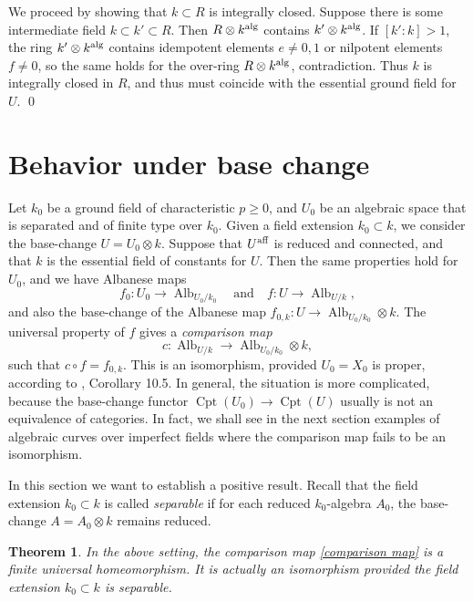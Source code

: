 \documentclass[oneside, 12pt]{amsart}
\newcommand\mylabel[1]{\label{#1}\marginpar{\vspace{-1ex}\medskip\medskip\footnotesize \tt #1}}
\renewcommand\mylabel[1]{\label{#1}}
\newtheorem{theorem}{Theorem}[section]
\theoremstyle{definition}
\theoremstyle{remark}
\newcommand{\aff}{\text{\rm aff}}
\newcommand{\alg}{\text{\rm alg}}
\newcommand{\Alb}{\operatorname{Alb}}
\newcommand{\lra}{\longrightarrow}
\newcommand{\quadand}{\quad\text{and}\quad}
\newcommand{\ra}{\rightarrow}
\newcommand{\Cpt}{\operatorname{Cpt}}
\begin{document}
We proceed by showing that $k\subset R$ is integrally closed.
Suppose there is some intermediate field $k\subset k'\subset R$.  Then $R\otimes k^\alg$ contains $k'\otimes k^\alg$. 
If $[k':k]>1$, the ring $k'\otimes k^\alg$ contains  idempotent elements $e\neq 0,1$ or     nilpotent elements $f\neq 0$, so the same
holds for the over-ring $R\otimes k^\alg$, contradiction.
Thus $k$ is integrally closed in $R$, and thus must coincide with the essential ground field for $U$.
\qed


\section{Behavior under base change}
\mylabel{Behavior}

Let $k_0$ be a ground field of characteristic $p\geq 0$, and $U_0$ be an algebraic space that is separated and of finite type over $k_0$.
Given a field extension $k_0\subset k$, we consider the base-change $U=U_0\otimes  k$.
Suppose that $U^\aff$ is reduced and connected, and that $k$ is the essential field of constants for $U$.
Then the same properties hold  for $U_0$, and we have   Albanese maps 
$$
f_0:U_0\lra\Alb_{U_0/k_0}\quadand f:U\lra \Alb_{U/k},
$$ 
and also the  base-change of the Albanese map $f_{0,k}:U\ra \Alb_{U_0/k_0}\otimes k$.
The universal property of $f$ gives a   \emph{comparison map}
\begin{equation}
\label{comparison map}
c:\Alb_{U/k}\lra \Alb_{U_0/k_0}\otimes k,
\end{equation}
such that $c\circ f =f_{0,k}$. This is an isomorphism, provided $U_0=X_0$ is proper, according to
\cite{Laurent; Schroeer 2021}, Corollary 10.5. In general, the situation is more complicated,
because the base-change functor $\Cpt(U_0)\ra \Cpt(U)$ usually is not  an equivalence of categories. 
In fact,  we shall see in the next section  examples of algebraic curves over imperfect   fields where the comparison map fails to be 
an isomorphism.  

In this section we want to establish a positive result. Recall that the field extension $k_0\subset k$ is called
\emph{separable} if for each reduced $k_0$-algebra $A_0$, the base-change $A=A_0\otimes k$ remains reduced.  

\begin{theorem}
\mylabel{base change}
In the above setting, the comparison map \eqref{comparison map} is a finite universal homeomorphism.
It is actually an isomorphism provided the field extension $k_0\subset k$ is separable.
\end{theorem}
\end{document}
